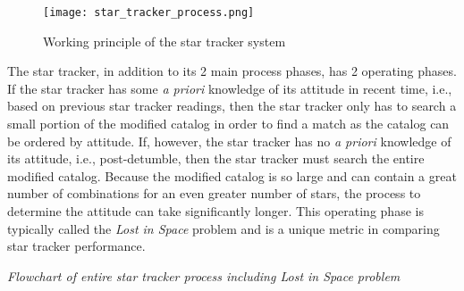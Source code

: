 \begin{figure}[h]
    \begin{adjustbox}{center}
        \texttt{[image: star\_tracker\_process.png]}
    \end{adjustbox}
    \caption{Working principle of the star tracker system \cite{rolling_shutter_errors}}
\end{figure}

\par \qquad The star tracker, in addition to its 2 main process phases, has 2 operating phases.
If the star tracker has some \emph{a priori} knowledge of its attitude in recent time, i.e., based on previous star tracker readings, then the star tracker only has to search a small portion of the modified catalog in order to find a match as the catalog can be ordered by attitude.
If, however, the star tracker has no \emph{a priori} knowledge of its attitude, i.e., post-detumble, then the star tracker must search the entire modified catalog.
Because the modified catalog is so large and can contain a great number of combinations for an even greater number of stars, the process to determine the attitude can take significantly longer.
This operating phase is typically called the \emph{Lost in Space} problem and is a unique metric in comparing star tracker performance.

\par \qquad \emph{Flowchart of entire star tracker process including Lost in Space problem}
